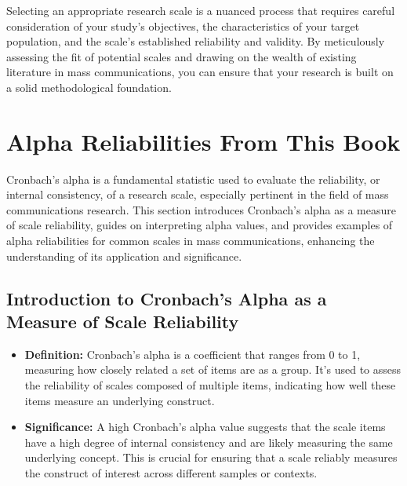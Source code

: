 \documentclass[
]{book}
\begin{document}
Selecting an appropriate research scale is a nuanced process that requires careful consideration of your study's objectives, the characteristics of your target population, and the scale's established reliability and validity. By meticulously assessing the fit of potential scales and drawing on the wealth of existing literature in mass communications, you can ensure that your research is built on a solid methodological foundation.

\hypertarget{alpha-reliabilities-from-this-book}{%
\section{Alpha Reliabilities From This Book}\label{alpha-reliabilities-from-this-book}}

Cronbach's alpha is a fundamental statistic used to evaluate the reliability, or internal consistency, of a research scale, especially pertinent in the field of mass communications research. This section introduces Cronbach's alpha as a measure of scale reliability, guides on interpreting alpha values, and provides examples of alpha reliabilities for common scales in mass communications, enhancing the understanding of its application and significance.

\hypertarget{introduction-to-cronbachs-alpha-as-a-measure-of-scale-reliability}{%
\subsection*{Introduction to Cronbach's Alpha as a Measure of Scale Reliability}\label{introduction-to-cronbachs-alpha-as-a-measure-of-scale-reliability}}

\begin{itemize}
\item
  \textbf{Definition:} Cronbach's alpha is a coefficient that ranges from 0 to 1, measuring how closely related a set of items are as a group. It's used to assess the reliability of scales composed of multiple items, indicating how well these items measure an underlying construct.
\item
  \textbf{Significance:} A high Cronbach's alpha value suggests that the scale items have a high degree of internal consistency and are likely measuring the same underlying concept. This is crucial for ensuring that a scale reliably measures the construct of interest across different samples or contexts.
\end{itemize}
\end{document}
